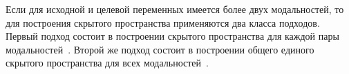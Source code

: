 Если для исходной и целевой переменных имеется более двух модальностей, то для построения скрытого пространства применяются два класса подходов. 
Первый подход состоит в построении скрытого пространства для каждой пары модальностей~\cite{masci2013multimodal,rajendran2015bridge}. 
Второй же подход состоит в построении общего единого скрытого пространства для всех модальностей~\cite{kumar2011co,sharma2012generalized}.